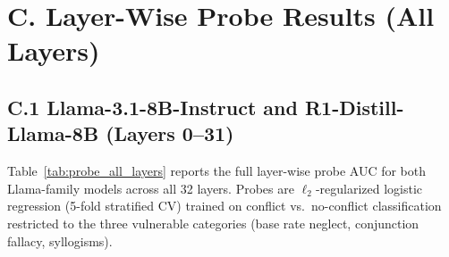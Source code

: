 \documentclass{article}
\begin{document}

\section*{C. Layer-Wise Probe Results (All Layers)}
\label{sec:appendix_probes}

\subsection*{C.1 Llama-3.1-8B-Instruct and R1-Distill-Llama-8B (Layers 0--31)}

Table~\ref{tab:probe_all_layers} reports the full layer-wise probe
AUC for both Llama-family models across all 32 layers.  Probes are
$\ell_2$-regularized logistic regression (5-fold stratified CV)
trained on conflict vs.\ no-conflict classification restricted to the
three vulnerable categories (base rate neglect, conjunction fallacy,
syllogisms).
\end{document}
